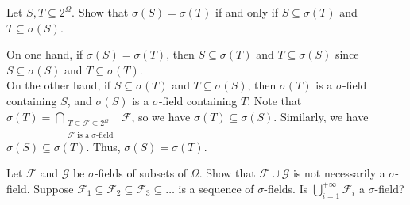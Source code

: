 \documentclass[a4paper, justified]{tufte-handout}
\begin{document}
\begin{problem}
  Let \( S,T \subseteq 2^{\Omega} \). Show that \( \sigma(S) = \sigma(T) \) if and only if \( S \subseteq \sigma(T) \) and \( T \subseteq \sigma(S) \). 
\end{problem}

\begin{solution}
  On one hand, if \( \sigma(S) = \sigma(T) \), then \( S \subseteq \sigma(T) \) and \( T \subseteq \sigma(S) \) since \( S \subseteq \sigma(S) \) and \( T \subseteq \sigma(T) \).\\
  On the other hand, if \( S \subseteq \sigma(T) \) and \( T \subseteq \sigma(S) \), then \(\sigma(T)\) is a \(\sigma\)-field containing \(S\), and \(\sigma(S)\) is a \(\sigma\)-field containing \(T\). Note that $\displaystyle{\sigma(T) = \bigcap_{\substack{T \subseteq \mathcal{F} \subseteq 2^\Omega\\ \mathcal{F} \text{ is a } \sigma\text{-field }} } \mathcal{F}}$, so we have \(\sigma(T) \subseteq \sigma(S)\). Similarly, we have \(\sigma(S) \subseteq \sigma(T)\). Thus, \(\sigma(S) = \sigma(T)\).
\end{solution}

\begin{problem}
  Let \(\mathcal{F}\) and \(\mathcal{G}\) be \(\sigma\)-fields of subsets of \(\Omega\). Show that \(\mathcal{F} \cup \mathcal{G}\) is not necessarily a \(\sigma\)-field. Suppose \(\mathcal{F}_1 \subseteq \mathcal{F}_2 \subseteq \mathcal{F}_3 \subseteq \ldots\) is a sequence of \(\sigma\)-fields. Is \(\displaystyle{\bigcup_{i=1}^{+\infty} \mathcal{F}_i}\) a \(\sigma\)-field?
\end{problem}
\end{document}
